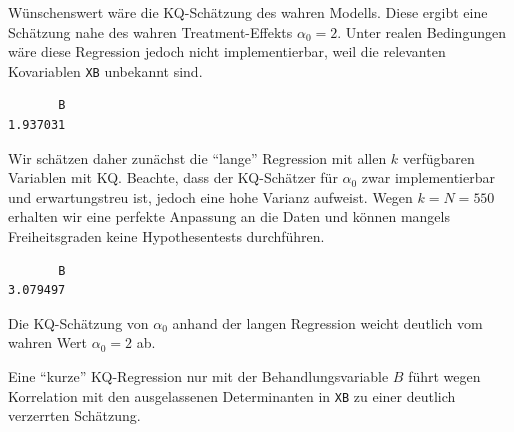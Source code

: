 \documentclass[
  a4paper,
  DIV=11,
  oneside]{scrreprt}
\newenvironment{Shaded}{\begin{snugshade}}{\end{snugshade}}
\newcommand{\AttributeTok}[1]{\textcolor[rgb]{0.40,0.45,0.13}{#1}}
\newcommand{\CommentTok}[1]{\textcolor[rgb]{0.37,0.37,0.37}{#1}}
\newcommand{\DecValTok}[1]{\textcolor[rgb]{0.68,0.00,0.00}{#1}}
\newcommand{\FunctionTok}[1]{\textcolor[rgb]{0.28,0.35,0.67}{#1}}
\newcommand{\NormalTok}[1]{\textcolor[rgb]{0.00,0.23,0.31}{#1}}
\newcommand{\SpecialCharTok}[1]{\textcolor[rgb]{0.37,0.37,0.37}{#1}}
\newcommand{\StringTok}[1]{\textcolor[rgb]{0.13,0.47,0.30}{#1}}
\begin{document}
Wünschenswert wäre die KQ-Schätzung des wahren Modells. Diese ergibt
eine Schätzung nahe des wahren Treatment-Effekts \(\alpha_0 = 2\). Unter
realen Bedingungen wäre diese Regression jedoch nicht implementierbar,
weil die relevanten Kovariablen \texttt{XB} unbekannt sind.

\begin{Shaded}
\end{Shaded}

\begin{verbatim}
       B 
1.937031 
\end{verbatim}

Wir schätzen daher zunächst die ``lange'' Regression mit allen \(k\)
verfügbaren Variablen mit KQ. Beachte, dass der KQ-Schätzer für
\(\alpha_0\) zwar implementierbar und erwartungstreu ist, jedoch eine
hohe Varianz aufweist. Wegen \(k=N=550\) erhalten wir eine perfekte
Anpassung an die Daten und können mangels Freiheitsgraden keine
Hypothesentests durchführen.

\begin{Shaded}
\end{Shaded}

\begin{verbatim}
       B 
3.079497 
\end{verbatim}

Die KQ-Schätzung von \(\alpha_0\) anhand der langen Regression weicht
deutlich vom wahren Wert \(\alpha_0 = 2\) ab.

Eine ``kurze'' KQ-Regression nur mit der Behandlungsvariable \(B\) führt
wegen Korrelation mit den ausgelassenen Determinanten in \texttt{XB} zu
einer deutlich verzerrten Schätzung.

\begin{Shaded}
\end{Shaded}
\end{document}
